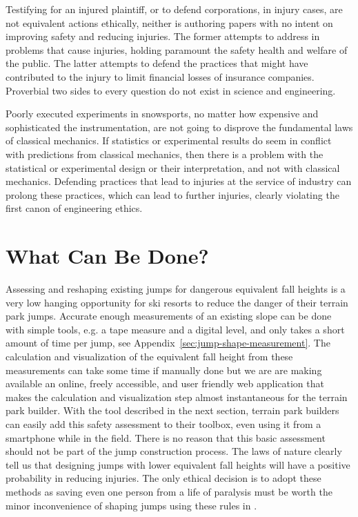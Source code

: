 \documentclass{article}
\begin{document}
Testifying for an injured plaintiff, or to defend corporations, in injury
cases, are not equivalent actions ethically, neither is authoring papers with
no intent on improving safety and reducing injuries. The former attempts to
address in problems that cause injuries, holding paramount the safety health
and welfare of the public. The latter attempts to defend the practices that
might have contributed to the injury to limit financial losses of insurance
companies. Proverbial two sides to every question do not exist in science and
engineering.

Poorly executed experiments in snowsports, no matter how expensive and
sophisticated the instrumentation, are not going to disprove the fundamental
laws of classical mechanics. If statistics or experimental results do seem in
conflict with predictions from classical mechanics, then there is a problem
with the statistical or experimental design or their interpretation, and not
with classical mechanics. Defending practices that lead to injuries at the
service of industry can prolong these practices, which can lead to further
injuries, clearly violating the first canon of engineering ethics.

\section{What Can Be Done?}
%
Assessing and reshaping existing jumps for dangerous equivalent fall heights is
a very low hanging opportunity for ski resorts to reduce the danger of their
terrain park jumps. Accurate enough measurements of an existing slope can be
done with simple tools, e.g. a tape measure and a digital level, and only takes
a short amount of time per jump, see Appendix~\ref{sec:jump-shape-measurement}.
The calculation and visualization of the equivalent fall height from these
measurements can take some time if manually done but we are are making
available an online, freely accessible, and user friendly web application that
makes the calculation and visualization step almost instantaneous for the
terrain park builder. With the tool described in the next section, terrain park
builders can easily add this safety assessment to their toolbox, even using it
from a smartphone while in the field. There is no reason that this basic
assessment should not be part of the jump construction process. The laws of
nature clearly tell us that designing jumps with lower equivalent fall heights
will have a positive probability in reducing injuries.  The only ethical
decision is to adopt these methods as saving even one person from a life of
paralysis must be worth the minor inconvenience of shaping jumps using these
rules in \cite{Levy2015}.
\end{document}
